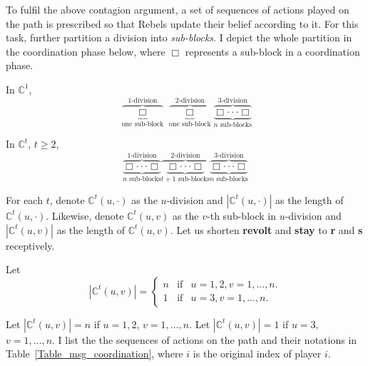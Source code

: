 \documentclass[12pt,letter]{article}
\newcommand{\Kappa}{\mathbb{C}}
\theoremstyle{definition}
\theoremstyle{remark}
\theoremstyle{claim}
\begin{document}
To fulfil the above contagion argument, a set of sequences of actions played on the path is prescribed so that Rebels update their belief according to it. For this task, further partition a division into \textit{sub-blocks}. I depict the whole partition in the coordination phase below, where $\Box$ represents a sub-block in a coordination phase. 

In $\Kappa^1$, 
\[\overbrace{\underbrace{ \Box }_{\text{one sub-block}}}^{\text{$1$-division}} \overbrace{\underbrace{\Box }_{\text{one sub-block}}}^{\text{$2$-division}} \overbrace{\underbrace{\Box \cdot \cdot \cdot \Box}_{\text{$n$ sub-blocks}}}^{\text{$3$-division}}\] 

In $\Kappa^t$, $t\geq 2$,
\[\overbrace{\underbrace{\Box \cdot \cdot \cdot \Box}_{\text{$n$ sub-blocks}}}^{\text{$1$-division}} \overbrace{\underbrace{\Box \cdot \cdot \cdot \Box}_{\text{$t+1$ sub-blocks}} }^{\text{$2$-division}} \overbrace{\underbrace{\Box \cdot \cdot \cdot \Box}_{\text{$n$ sub-blocks}}}^{\text{$3$-division}}\] 




For each $t$, denote $\Kappa^t(u,\cdot)$ as the $u$-division and $|\Kappa^t(u,\cdot) |$ as the length of $\Kappa^t(u,\cdot)$. Likewise, denote $\Kappa^t(u,v)$ as the $v$-th sub-block in $u$-division and $|\Kappa^t(u,v) |$ as the length of $\Kappa^t(u,v)$. Let us shorten \textbf{revolt} and \textbf{stay} to \textbf{r} and \textbf{s} receptively. 

Let
\[
    |\Kappa^t(u,v)|=\left\{
                \begin{array}{lcl}
                  n & \text{if} & u=1,2, v=1,...,n.\\
                 1 & \text{if} & u=3, v=1,...,n.
                \end{array}
              \right. 
\]


Let $|\Kappa^t(u,v)|=n$ if $u=1,2$, $v=1,...,n$. Let $|\Kappa^t(u,v)|=1$ if $u=3$, $v=1,...,n$. I list the the sequences of actions on the path and their notations in Table~\ref{Table_msg_coordination}, where $i$ is the original index of player $i$.
\end{document}
